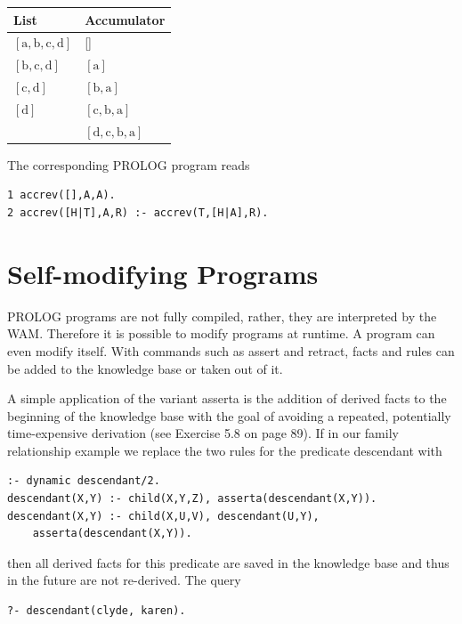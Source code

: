 \documentclass[10pt]{book}
\begin{document}
\begin{center}
\begin{tabular}{ll}
\hline
List & Accumulator \\
\hline
$[\mathrm{a}, \mathrm{b}, \mathrm{c}, \mathrm{d}]$ & [] \\
\hline
$[\mathrm{b}, \mathrm{c}, \mathrm{d}]$ & $[\mathrm{a}]$ \\
\hline
$[\mathrm{c}, \mathrm{d}]$ & $[\mathrm{b}, \mathrm{a}]$ \\
\hline
$[\mathrm{d}]$ & $[\mathrm{c}, \mathrm{b}, \mathrm{a}]$ \\
\hline
[] & $[\mathrm{d}, \mathrm{c}, \mathrm{b}, \mathrm{a}]$ \\
\hline
\end{tabular}
\end{center}

The corresponding PROLOG program reads

\begin{verbatim}
1 accrev([],A,A).
2 accrev([H|T],A,R) :- accrev(T,[H|A],R).
\end{verbatim}

\section{Self-modifying Programs}
PROLOG programs are not fully compiled, rather, they are interpreted by the WAM. Therefore it is possible to modify programs at runtime. A program can even modify itself. With commands such as assert and retract, facts and rules can be added to the knowledge base or taken out of it.

A simple application of the variant asserta is the addition of derived facts to the beginning of the knowledge base with the goal of avoiding a repeated, potentially time-expensive derivation (see Exercise 5.8 on page 89). If in our family relationship example we replace the two rules for the predicate descendant with

\begin{verbatim}
:- dynamic descendant/2.
descendant(X,Y) :- child(X,Y,Z), asserta(descendant(X,Y)).
descendant(X,Y) :- child(X,U,V), descendant(U,Y),
    asserta(descendant(X,Y)).
\end{verbatim}

then all derived facts for this predicate are saved in the knowledge base and thus in the future are not re-derived. The query

\begin{verbatim}
?- descendant(clyde, karen).
\end{verbatim}
\end{document}
